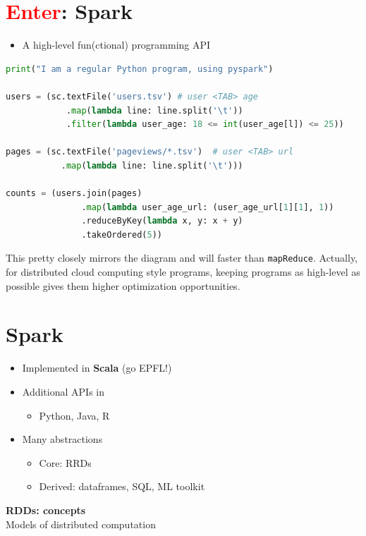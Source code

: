 \documentclass[11pt]{article}
\begin{document}
\section*{\textcolor{red}{Enter}: Spark}
\begin{itemize}
	\item A high-level fun(ctional) programming API
\end{itemize}
\begin{lstlisting}[language=Python]
print("I am a regular Python program, using pyspark")

users = (sc.textFile('users.tsv') # user <TAB> age
        	.map(lambda line: line.split('\t'))
        	.filter(lambda user_age: 18 <= int(user_age[l]) <= 25))

pages = (sc.textFile('pageviews/*.tsv')  # user <TAB> url
           .map(lambda line: line.split('\t')))

counts = (users.join(pages)
               .map(lambda user_age_url: (user_age_url[1][1], 1))
               .reduceByKey(lambda x, y: x + y)
               .takeOrdered(5))
\end{lstlisting}

This pretty closely mirrors the diagram and will faster than \verb|mapReduce|. Actually, for distributed cloud computing style programs, keeping programs as high-level as possible gives them higher optimization opportunities. 

\section*{Spark}

\begin{itemize}
	\item Implemented in \textbf{Scala} (go EPFL!)
	\item Additional APIs in 
		\begin{itemize}
			\item Python, Java, R
		\end{itemize}
	\item Many abstractions
		\begin{itemize}
			\item Core: RRDs
			\item Derived: dataframes, SQL, ML toolkit
		\end{itemize}
\end{itemize}

\vspace{0.5cm}

\begin{center}
  {\LARGE \textbf{RDDs: concepts}} \\
  Models of distributed computation
\end{center}
\vspace{0.5cm}
\end{document}
